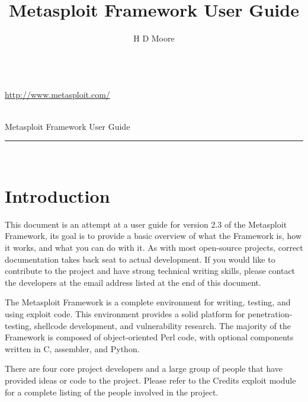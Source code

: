 \documentclass{report}
\begin{document}
\title{Metasploit Framework User Guide}
\author{H D Moore}

\begin{titlepage}
    \begin{center}
        \ \\[10mm]
        \url{http://www.metasploit.com/}

        \ \\[10mm]

        \huge{Metasploit Framework User Guide} \\[120mm]
        \rule{10cm}{1pt} \\[4mm]
        \renewcommand{\arraystretch}{0.5}
    \end{center}
\end{titlepage}

\tableofcontents

\setlength{\parindent}{0pt} \setlength{\parskip}{8pt}



\chapter{Introduction}

\par
This document is an attempt at a user guide for version 2.3 of the Metasploit
Framework, its goal is to provide a basic overview of what the Framework is, how
it works, and what you can do with it. As with most open-source projects,
correct documentation takes back seat to actual development. If you would like
to contribute to the project and have strong technical writing skills, please
contact the developers at the email address listed at the end of this document. 

\par
The Metasploit Framework is a complete environment for writing, testing, and
using exploit code. This environment provides a solid platform for
penetration-testing, shellcode development, and vulnerability research. The
majority of the Framework is composed of object-oriented Perl code, with
optional components written in C, assembler, and Python.  

\par
There are four core project developers and a large group of people that have
provided ideas or code to the project. Please refer to the Credits exploit
module for a complete listing of the people involved in the project. 
\end{document}
